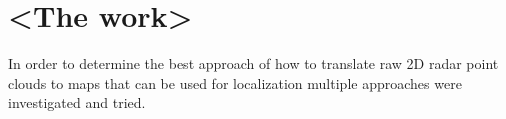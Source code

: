 \chapter{<The work>}


In order to determine the best approach of how to translate raw 2D radar point clouds to maps that can be used for localization multiple approaches were investigated and tried. 
